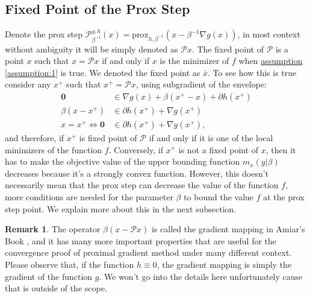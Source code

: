 \documentclass[]{article}
\theoremstyle{definition}
\newtheorem{remark}{Remark}[subsection]
{
    \newtheorem{assumption}{Assumption}
}
\begin{document}
    \subsection{Fixed Point of the Prox Step}\label{sec:fixed_point_prox}
        Denote the prox step $\mathcal P_{\beta^{-1}}^{g, h}(x) = \text{prox}_{h, \beta^{-1}}(x - \beta^{-1}\nabla g(x))$, in most context without ambiguity it will be simply denoted as $\mathcal Px$. The fixed point of $\mathcal P$ is a point $x$ such that $x = \mathcal P x$ if and only if $x$ is the minimizer of $f$ when \hyperref[assumption:1]{assumption \ref*{assumption:1}} is true. We denoted the fixed point as $\bar x$. To see how this is true consider any $x^+$ such that $x^+ = \mathcal Px$, using subgradient of the envelope: 
        \begin{align*}
            \mathbf 0 
            &\in \nabla g(x) + \beta(x^+ - x) + \partial h(x^+)
            \\
            \beta(x - x^+) &\in \partial h(x^+) + \nabla g(x^+)
            \\
            x = x^+ \iff \mathbf 0 &\in 
            \partial h(x^+) + \nabla g(x^+), 
        \end{align*}
        and therefore, if $x^+$ is fixed point of $\mathcal P$ if and only if it is one of the local minimizers of the function $f$. Conversely, if $x^+$ is not a fixed point of $x$, then it has to make the objective value of the upper bounding function $m_x(y| \beta)$ decreases because it's a strongly convex function. However, this doesn't necessarily mean that the prox step can decrease the value of the function $f$, more conditions are needed for the parameter $\beta$ to bound the value $f$ at the prox step point. We explain more about this in the next subsection. 
        \begin{remark}
            The operator $\beta(x - \mathcal Px)$ is called the gradient mapping in Amiar's Book \cite{book:first_order_opt}, and it has many more important properties that are useful for the convergence proof of proximal gradient method under many different context. Please observe that, if the function $h \equiv 0$, the gradient mapping is simply the gradient of the function $g$. We won't go into the details here unfortunately cause that is outside of the scope. 
        \end{remark}
\end{document}
